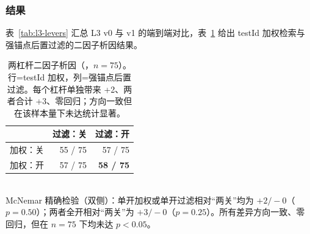 \subsubsection{结果}
表~\ref{tab:l3-levers} 汇总 L3 v0 与 v1 的端到端对比，表~\ref{tab:l3-factorial} 给出 testId 加权检索与强锚点后置过滤的二因子析因结果。

\begin{table}[H]
\centering
\caption{L3 v0 $\to$ v1 端到端对比（75 个可达 koenig 失效）。v1 = v0 + testId 加权检索 + 强锚点后置过滤；v0 为两杠杆均关的统一权重基线。}
\label{tab:l3-levers}
\small
{}
\end{table}

\begin{table}[H]
\centering
\caption{两杠杆二因子析因（，$n=75$）。行=testId 加权，列=强锚点后置过滤。每个杠杆单独带来 +2、两者合计 +3、零回归；方向一致但在该样本量下未达统计显著。}
\label{tab:l3-factorial}
\small
\begin{tabular}{lrr}
\toprule
 & 过滤：关 & 过滤：开 \\
\midrule
加权：关 & 55 / 75 & 57 / 75 \\
加权：开 & 57 / 75 & \textbf{58 / 75} \\
\bottomrule
\end{tabular}
\\[2pt]
{\scriptsize McNemar 精确检验（双侧）：单开加权或单开过滤相对“两关”均为 $+2/-0$（$p=0.50$）；两者全开相对“两关”为 $+3/-0$（$p=0.25$）。所有差异方向一致、零回归，但在 $n=75$ 下均未达 $p<0.05$。}
\end{table}

